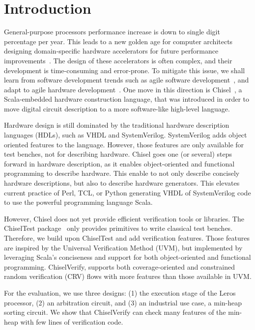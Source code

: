 \documentclass[conference]{IEEEtran}
\begin{document}
\section{Introduction}
\label{sec:introduction}

General-purpose processors performance increase is down to single digit percentage per year.
This leads to a new golden age for computer architects designing domain-specific hardware accelerators
for future performance improvements~\cite{domain-hw-acc:2020}.
The design of these accelerators is often complex, and their development is time-consuming and error-prone.
To mitigate this issue, we shall learn from software development trends such as agile software
development~\cite{agile:manifesto}, and adapt to agile hardware development~\cite{henn-patt:turing:2019}.
One move in this direction is Chisel~\cite{chisel:dac2012}, a Scala-embedded hardware construction language,
that was introduced in order to move digital circuit description to a more software-like high-level language. 

Hardware design is still dominated by the traditional hardware description languages (HDLs), such as VHDL and SystemVerilog.
SystemVerilog adds object oriented features to the language. However, those features are only available for test benches,
not for describing hardware.
Chisel goes one (or several) steps forward in hardware description, as it enables object-oriented and functional programming
to describe hardware. This enable to not only describe concisely hardware descriptions, but also to describe hardware generators.
This elevates current practice of Perl, TCL, or Python generating VHDL of SystemVerilog code to use the powerful programming
language Scala.

However, Chisel does not yet provide efficient verification tools or libraries. The ChiselTest package~\cite{chisel:tester2}
only provides primitives to write classical test benches.
Therefore, we build upon ChiselTest and add verification features. Those features are inspired by the
Universal Verification Method (UVM), but implemented by leveraging
Scala's conciseness and support for both object-oriented and functional programming.
ChiselVerify, supports both coverage-oriented and constrained
random verification (CRV) flows with more features than those available in UVM.

For the evaluation, we use three designs: (1) the execution stage of the Leros processor, (2) an arbitration circuit, and (3) an industrial use case, a min-heap sorting circuit.
We show that ChiselVerify can check many features of the min-heap with few lines of 
verification code.
\end{document}
